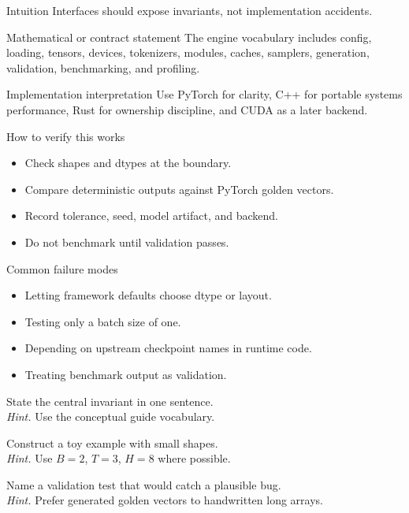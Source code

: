 \begin{intuitionbox}{Intuition}
Interfaces should expose invariants, not implementation accidents.
\end{intuitionbox}

\begin{definitionbox}{Mathematical or contract statement}
The engine vocabulary includes config, loading, tensors, devices, tokenizers, modules, caches, samplers, generation, validation, benchmarking, and profiling.
\end{definitionbox}

\begin{implementationbox}{Implementation interpretation}
Use PyTorch for clarity, C++ for portable systems performance, Rust for ownership discipline, and CUDA as a later backend.
\end{implementationbox}

\begin{verificationbox}{How to verify this works}
\begin{itemize}
\item Check shapes and dtypes at the boundary.
\item Compare deterministic outputs against PyTorch golden vectors.
\item Record tolerance, seed, model artifact, and backend.
\item Do not benchmark until validation passes.
\end{itemize}
\end{verificationbox}

\begin{warningbox}{Common failure modes}
\begin{itemize}
\item Letting framework defaults choose dtype or layout.
\item Testing only a batch size of one.
\item Depending on upstream checkpoint names in runtime code.
\item Treating benchmark output as validation.
\end{itemize}
\end{warningbox}

\begin{chapterexercises}
\item State the central invariant in one sentence.\\
\textit{Hint.} Use the conceptual guide vocabulary.
\item Construct a toy example with small shapes.\\
\textit{Hint.} Use $B=2$, $T=3$, $H=8$ where possible.
\item Name a validation test that would catch a plausible bug.\\
\textit{Hint.} Prefer generated golden vectors to handwritten long arrays.
\end{chapterexercises}
